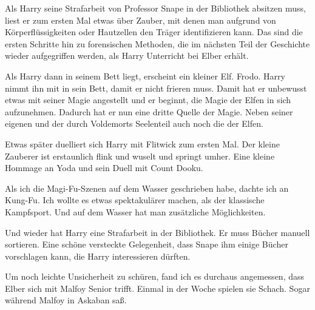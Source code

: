 \begin{kommentar}
Als Harry seine Strafarbeit von Professor Snape in der Bibliothek absitzen muss, liest er zum ersten Mal etwas über Zauber, mit denen man aufgrund von Körperflüssigkeiten oder Hautzellen den Träger identifizieren kann. Das sind die ersten Schritte hin zu forensischen Methoden, die im nächsten Teil der Geschichte wieder aufgegriffen werden, als Harry Unterricht bei Elber erhält.
\end{kommentar}

\begin{kommentar}
Als Harry dann in seinem Bett liegt, erscheint ein kleiner Elf. Frodo. Harry nimmt ihn mit in sein Bett, damit er nicht frieren muss. Damit hat er unbewusst etwas mit seiner Magie angestellt und er beginnt, die Magie der Elfen in sich aufzunehmen. Dadurch hat er nun eine dritte Quelle der Magie. Neben seiner eigenen und der durch Voldemorts Seelenteil auch noch die der Elfen.
\end{kommentar}

\begin{kommentar}
Etwas später duelliert sich Harry mit Flitwick zum ersten Mal. Der kleine Zauberer ist erstaunlich flink und wuselt und springt umher. Eine kleine Hommage an Yoda und sein Duell mit Count Dooku.
\end{kommentar}

\begin{kommentar}
Als ich die Magi-Fu-Szenen auf dem Wasser geschrieben habe, dachte ich an Kung-Fu. Ich wollte es etwas spektakulärer machen, als der klassische Kampfsport. Und auf dem Wasser hat man zusätzliche Möglichkeiten.
\end{kommentar}

\begin{kommentar}
Und wieder hat Harry eine Strafarbeit in der Bibliothek. Er muss Bücher manuell sortieren. Eine schöne versteckte Gelegenheit, dass Snape ihm einige Bücher vorschlagen kann, die Harry interessieren dürften.
\end{kommentar}

\begin{kommentar}
Um noch leichte Unsicherheit zu schüren, fand ich es durchaus angemessen, dass Elber sich mit Malfoy Senior trifft. Einmal in der Woche spielen sie Schach. Sogar während Malfoy in Askaban saß.
\end{kommentar}
